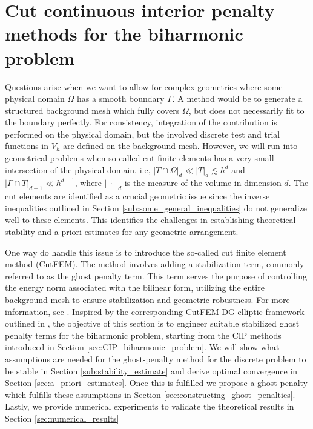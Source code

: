 \documentclass[11pt]{article}
\theoremstyle{remark}
\newcommand{\abs}[1]{\left\lvert #1 \right\rvert}
\numberwithin{equation}{section}
\begin{document}



\section{Cut continuous interior penalty methods for the biharmonic problem}%
\label{sec:cutcip_biharmonic_problem}


Questions arise when we want to allow for complex geometries where some physical domain $\Omega $ has a smooth boundary $\Gamma $.
A method would be to generate a structured background mesh which fully covers $\Omega $, but does not necessarily fit to the boundary perfectly.
For consistency, integration of the contribution is performed on the physical domain, but the involved discrete test and trial functions in $V_{h}$ are defined on the background mesh.
However, we will run into geometrical problems when
so-called cut finite elements has a very small intersection of the physical domain, i.e, $\abs{ T \cap \Omega  }_{d} \ll \abs{ T }_{d}  \lesssim h^{d}$ and $\abs{ \Gamma \cap T }_{d-1} \ll  h^{d-1}$, where $\abs{\ \cdot \  }_{d} $ is the
measure of the volume in dimension $d$.
The cut elements are identified as a crucial geometric issue since the inverse inequalities outlined in Section \ref{sub:some_general_inequalities} do not generalize well to these elements. This identifies the challenges in establishing theoretical stability and a priori estimates for any geometric arrangement.

One way do handle this issue is to introduce the so-called cut finite element method (CutFEM).
The method involves adding a stabilization term, commonly referred to as the ghost penalty term.
This term serves the purpose of controlling the energy norm associated with the bilinear form, utilizing the entire background mesh to ensure stabilization and geometric robustness.
For more information, see
\cite{burman2015cutfem, burman2010ghost, burman2022cutfem, burman2012fictitious}.
Inspired by the corresponding CutFEM DG elliptic framework outlined in \cite{gurkan2019stabilized}, the objective of this section is to engineer suitable stabilized ghost penalty terms for the biharmonic problem, starting from the CIP methods introduced in Section \ref{sec:CIP_biharmonic_problem}.
We will show what assumptions are needed for the ghost-penalty method for the discrete problem to be stable in Section \ref{sub:stability_estimate} and derive optimal convergence in Section \ref{sec:a_priori_estimates}.  Once
this is fulfilled we propose a ghost penalty which fulfills these assumptions in Section \ref{sec:constructing_ghost_penalties}. Lastly, we provide numerical experiments to validate the theoretical results in Section \ref{sec:numerical_results}
\end{document}
